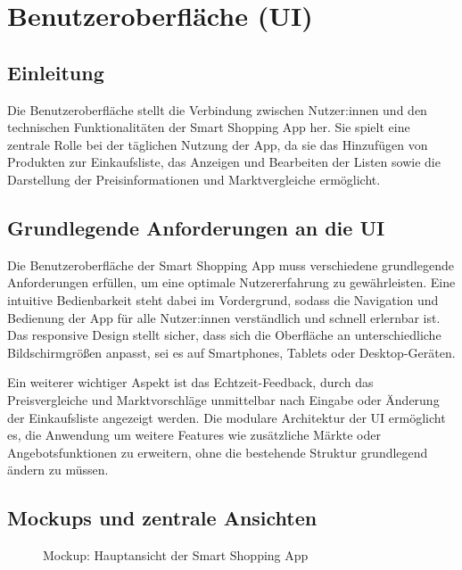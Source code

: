 \chapter{Benutzeroberfläche (UI)}
\renewcommand{\authorinitials}{NK}
\label{chap:ui}

\section{Einleitung}
Die Benutzeroberfläche stellt die Verbindung zwischen Nutzer:innen und den technischen Funktionalitäten der Smart Shopping App her. Sie spielt eine zentrale Rolle bei der täglichen Nutzung der App, da sie das Hinzufügen von Produkten zur Einkaufsliste, das Anzeigen und Bearbeiten der Listen sowie die Darstellung der Preisinformationen und Marktvergleiche ermöglicht.

\section{Grundlegende Anforderungen an die UI}
Die Benutzeroberfläche der Smart Shopping App muss verschiedene grundlegende Anforderungen erfüllen, um eine optimale Nutzererfahrung zu gewährleisten. Eine intuitive Bedienbarkeit steht dabei im Vordergrund, sodass die Navigation und Bedienung der App für alle Nutzer:innen verständlich und schnell erlernbar ist. Das responsive Design stellt sicher, dass sich die Oberfläche an unterschiedliche Bildschirmgrößen anpasst, sei es auf Smartphones, Tablets oder Desktop-Geräten.

Ein weiterer wichtiger Aspekt ist das Echtzeit-Feedback, durch das Preisvergleiche und Marktvorschläge unmittelbar nach Eingabe oder Änderung der Einkaufsliste angezeigt werden. Die modulare Architektur der UI ermöglicht es, die Anwendung um weitere Features wie zusätzliche Märkte oder Angebotsfunktionen zu erweitern, ohne die bestehende Struktur grundlegend ändern zu müssen.

\section{Mockups und zentrale Ansichten}
\begin{figure}[h!]
    \centering
    \caption{Mockup: Hauptansicht der Smart Shopping App}
    \label{fig:ui_mockup}
\end{figure}

